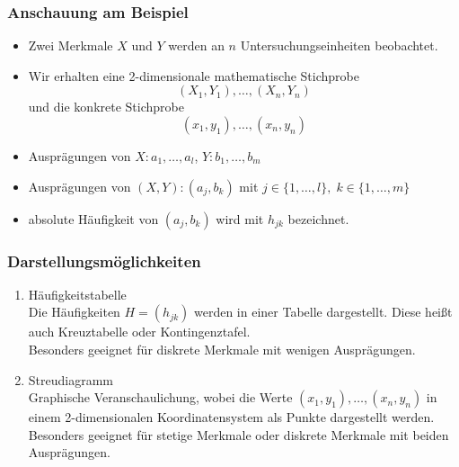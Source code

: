 \documentclass{scrreprt}
\begin{document}
\subsubsection{Anschauung am Beispiel}
\begin{itemize}
\item Zwei Merkmale $X$ und $Y$ werden an $n$ Untersuchungseinheiten beobachtet.
\item Wir erhalten eine 2-dimensionale mathematische Stichprobe
$$(X_1, Y_1), \ldots , (X_n, Y_n)$$
und die konkrete Stichprobe 
$$(x_1,y_1), \ldots, (x_n,y_n)$$
\item Ausprägungen von $X: a_1, \ldots, a_l$, $Y: b_1, \ldots, b_m$
\item Ausprägungen von $(X,Y): (a_j,b_k)$ mit $j\in\{1,\ldots, l\},\; k \in \{1,\ldots ,m\}$
\item absolute Häufigkeit von $(a_j, b_k)$ wird mit $h_{jk}$ bezeichnet.
\end{itemize}
\subsubsection*{Darstellungsmöglichkeiten}
\begin{enumerate}
\item Häufigkeitstabelle\\
Die Häufigkeiten $H=(h_{jk})$ werden in einer Tabelle dargestellt. Diese heißt auch Kreuztabelle oder Kontingenztafel.\\
Besonders geeignet für diskrete Merkmale mit wenigen Ausprägungen.
\item Streudiagramm\\
Graphische Veranschaulichung, wobei die Werte $(x_1,y_1),\ldots ,(x_n, y_n)$ in einem 2-dimensionalen Koordinatensystem als Punkte dargestellt werden.\\
Besonders geeignet für stetige Merkmale oder diskrete Merkmale mit beiden Ausprägungen.
\end{enumerate}
\end{document}
